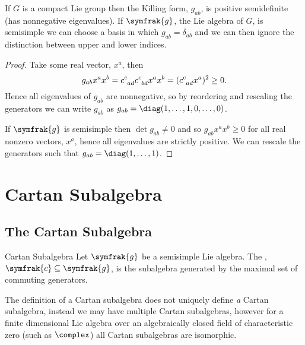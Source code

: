 \documentclass[fleqn]{NotesClass}
\renewcommand{\lie}[1]{\symfrak{#1}}
\begin{document}
    \begin{thm}{}{}
        If \(G\) is a compact Lie group then the Killing form, \(g_{ab}\), is positive semidefinite (has nonnegative eigenvalues).
        If \(\lie{g}\), the Lie algebra of \(G\), is semisimple we can choose a basis in which \(g_{ab} = \delta_{ab}\) and we can then ignore the distinction between upper and lower indices.
        \begin{proof}
            Take some real vector, \(x^a\), then
            \begin{equation}
                g_{ab}x^a x^b = \tensor{c}{^c_{ad}} \tensor{c}{^c_{bd}} x^a x^b = (\tensor{c}{^c_{ad}}x^a)^2 \ge 0.
            \end{equation}
            Hence all eigenvalues of \(g_{ab}\) are nonnegative, so by reordering and rescaling the generators we can write \(g_{ab}\) as \(g_{ab} = \diag(1, \dotsc, 1, 0, \dotsc, 0)\).
            
            If \(\lie{g}\) is semisimple then \(\det g_{ab} \ne 0\) and so \(g_{ab} x^a x^b \ge 0\) for all real nonzero vectors, \(x^a\), hence all eigenvalues are strictly positive.
            We can rescale the generators such that \(g_{ab} = \diag(1, \dotsc, 1)\).
        \end{proof}
    \end{thm}
    
    \chapter{Cartan Subalgebra}
    \section{The Cartan Subalgebra}
    \begin{dfn}{Cartan Subalgebra}{}
        Let \(\lie{g}\) be a semisimple Lie algebra.
        The , \(\lie{c} \subseteq \lie{g}\), is the subalgebra generated by the maximal set of commuting generators.
    \end{dfn}
    
    \begin{rmk}
        The definition of a Cartan subalgebra does not uniquely define \emph{a} Cartan subalgebra, instead we may have multiple Cartan subalgebras, however for a finite dimensional Lie algebra over an algebraically closed field of characteristic zero (such as \(\complex\)) all Cartan subalgebras are isomorphic.
    \end{rmk}
    
\end{document}
